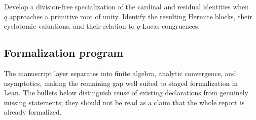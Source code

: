 \begin{problem}
\label{gq:prob:cyclotomic-confluent-limit}
Develop a division-free specialization of the cardinal and residual
identities when $q$ approaches a primitive root of unity.  Identify the
resulting Hermite blocks, their cyclotomic valuations, and their relation to
$q$-Lucas congruences.
\end{problem}

\subsection{Formalization program}
\label{gq:sec:formalization-program}

The manuscript layer separates into finite algebra, analytic convergence,
and asymptotics, making the remaining gap well suited to staged
formalization in Lean.  The bullets below distinguish reuse of existing
declarations from genuinely missing statements; they should not be read as
a claim that the whole report is already formalized.

